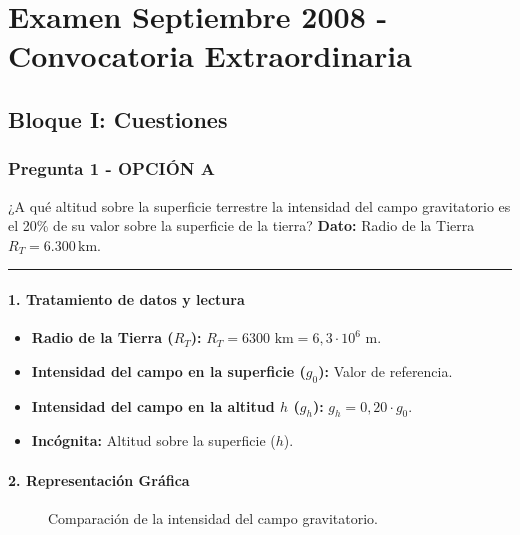 \chapter{Examen Septiembre 2008 - Convocatoria Extraordinaria}
\label{chap:2008_sep_ext}

\section{Bloque I: Cuestiones}
\label{sec:grav_2008_sep_ext}

\subsection{Pregunta 1 - OPCIÓN A}
\label{subsec:1A_2008_sep_ext}

\begin{cajaenunciado}
¿A qué altitud sobre la superficie terrestre la intensidad del campo gravitatorio es el 20\% de su valor sobre la superficie de la tierra?
\textbf{Dato:} Radio de la Tierra $R_T = 6.300\,\text{km}$.
\end{cajaenunciado}
\hrule

\subsubsection*{1. Tratamiento de datos y lectura}
\begin{itemize}
    \item \textbf{Radio de la Tierra ($R_T$):} $R_T = 6300 \text{ km} = 6,3 \cdot 10^6 \text{ m}$.
    \item \textbf{Intensidad del campo en la superficie ($g_0$):} Valor de referencia.
    \item \textbf{Intensidad del campo en la altitud $h$ ($g_h$):} $g_h = 0,20 \cdot g_0$.
    \item \textbf{Incógnita:} Altitud sobre la superficie ($h$).
\end{itemize}

\subsubsection*{2. Representación Gráfica}
\begin{figure}[H]
    \centering
    \caption{Comparación de la intensidad del campo gravitatorio.}
\end{figure}

